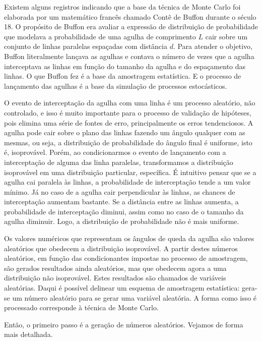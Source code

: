 \documentclass[a4paper,12pt,oneside,onecolumn]{uerj/uerj}
\begin{document}
Existem alguns registros indicando que a base da técnica de Monte Carlo foi elaborada por um matemático francês chamado Contê de Buffon durante o século 18. O propósito de Buffon era avaliar a expressão de distribuição de probabilidade que modelava a probabilidade de uma agulha de comprimento $L$ cair sobre um conjunto de linhas paralelas espaçadas com distância $d$. Para atender o objetivo, Buffon literalmente lançava as agulhas e contava o número de vezes que a agulha interceptava as linhas em função do tamanho da agulha e do espaçamento das linhas. O que Buffon fez é a base da amostragem estatística. E o processo de lançamento das agulhas é a base da simulação de processos estocásticos.

O evento de interceptação da agulha com uma linha é um processo aleatório, não controlado, e isso é muito importante para o processo de validação de hipóteses, pois elimina uma série de fontes de erro, principalmente os erros tendenciosos. A agulha pode cair sobre o plano das linhas fazendo um ângulo qualquer com as mesmas, ou seja, a distribuição de probabilidade do ângulo final é uniforme, isto é, isoprovável. Porém, ao condicionarmos o evento de lançamento com a interceptação de alguma das linha paralelas, transformamos a distribuição isoprovável em uma distribuição particular, específica. É intuitivo pensar que se a agulha cai paralela às linhas, a probabilidade de interceptação tende a um valor mínimo. Já no caso de a agulha cair perpendicular às linhas, as chances de interceptação aumentam bastante. Se a distância entre as linhas aumenta, a probabilidade de interceptação diminui, assim como no caso de o tamanho da agulha diminuir. Logo, a distribuição de probabilidade não é mais uniforme.

Os valores numéricos que representam os ângulos de queda da agulha são valores aleatórios que obedecem a distribuição isoprovável. A partir destes números aleatórios, em função das condicionantes impostas no processo de amostragem, são gerados resultados ainda aleatórios, mas que obedecem agora a uma distribuição não isoprovável. Estes resultados são chamados de variáveis aleatórias. Daqui é possível delinear um esquema de amostragem estatística: gera-se um número aleatório para se gerar uma variável aleatória. A forma como isso é processado corresponde à técnica de Monte Carlo.

Então, o primeiro passo é a geração de números aleatórios. Vejamos de forma mais detalhada.

\end{document}
